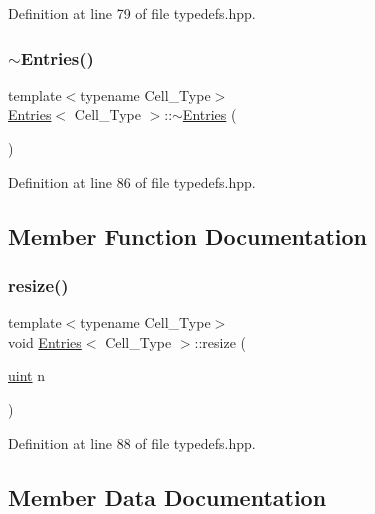 Definition at line 79 of file typedefs.\+hpp.

\mbox{\label{class_entries_aeda42186376731bd3a9b3902a09395a4}} 
\subsubsection{\texorpdfstring{$\sim$\+Entries()}{~Entries()}}
{\footnotesize\ttfamily template$<$typename Cell\+\_\+\+Type$>$ \\
\hyperlink{class_entries}{Entries}$<$ Cell\+\_\+\+Type $>$\+::$\sim$\hyperlink{class_entries}{Entries} (\begin{DoxyParamCaption}{ }\end{DoxyParamCaption})\hspace{0.3cm}{\ttfamily [inline]}}



Definition at line 86 of file typedefs.\+hpp.



\subsection{Member Function Documentation}
\mbox{\label{class_entries_a8b539e4c53aab5d6ce8305af346b7089}} 
\subsubsection{\texorpdfstring{resize()}{resize()}}
{\footnotesize\ttfamily template$<$typename Cell\+\_\+\+Type$>$ \\
void \hyperlink{class_entries}{Entries}$<$ Cell\+\_\+\+Type $>$\+::resize (\begin{DoxyParamCaption}\item[{\hyperlink{typedefs_8hpp_a91ad9478d81a7aaf2593e8d9c3d06a14}{uint}}]{n }\end{DoxyParamCaption})\hspace{0.3cm}{\ttfamily [inline]}}



Definition at line 88 of file typedefs.\+hpp.



\subsection{Member Data Documentation}
\mbox{\label{class_entries_a6a7c589df4cd6ea98386466440dfdc98}} 
